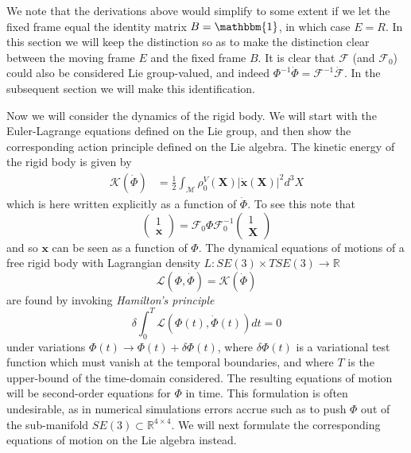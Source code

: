 We note that the derivations above would simplify to some extent if we let the fixed frame equal the identity matrix $B=\mathbbm{1}$, in which case $E = R$. In this section we will keep the distinction so as to make the distinction clear between the moving frame $E$ and the fixed frame $B$. It is clear that $\mathcal{F}$ (and $\mathcal{F}_0$) could also be considered Lie group-valued, and indeed $\Phi^{-1} \dot{\Phi} = \mathcal{F}^{-1} \dot{\mathcal{F}}$. In the subsequent section we will make this identification.

Now we will consider the dynamics of the rigid body. We will start with the Euler-Lagrange equations defined on the Lie group, and then show the corresponding action principle defined on the Lie algebra. The kinetic energy of the rigid body is given by
\begin{equation}  \label{eq:rigid body kinetic energy}
\begin{aligned}
\mathcal{K}(\dot{\Phi}) & = \frac{1}{2} \int_\mathscr{M} \rho^V_0(\mathbf{X}) |\dot{\mathbf{x}}(\mathbf{X})|^2  d^3 X
\end{aligned}
\end{equation}
which is here written explicitly as a function of $\dot{\Phi}$. To see this note that
\begin{equation}
\begin{pmatrix} 1 \\ \mathbf{x} \end{pmatrix} = \mathcal{F}_0 \Phi \mathcal{F}_0^{-1} \begin{pmatrix} 1 \\ \mathbf{X} \end{pmatrix}
\end{equation}
and so $\mathbf{x}$ can be seen as a function of $\Phi$. The dynamical equations of motions of a free rigid body with Lagrangian density $L : SE(3) \times TSE(3) \to \mathbb{R}$
\begin{equation}
\mathcal{L}(\Phi, \dot{\Phi}) = \mathcal{K}(\dot{\Phi})
\end{equation}
are found by invoking \textit{Hamilton's principle}
\begin{equation} \label{eq:rigid body hamiltons principle}
\delta \int_0^{T} \mathcal{L}(\Phi(t), \dot{\Phi}(t)) dt = 0
\end{equation}
under variations $\Phi(t) \to \Phi(t) + \delta \Phi (t)$, where $\delta \Phi (t)$ is a variational test function which must vanish at the temporal boundaries, and where $T$ is the upper-bound of the time-domain considered. The resulting equations of motion will be second-order equations for $\Phi$ in time. This formulation is often undesirable, as in numerical simulations errors accrue such as to push $\Phi$ out of the sub-manifold $SE(3) \subset \mathbb{R}^{4 \times 4}$. We will next formulate the corresponding equations of motion on the Lie algebra instead.

